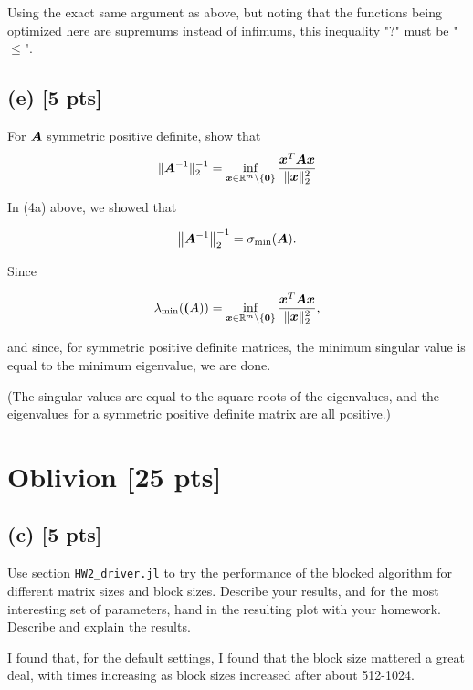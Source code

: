 \documentclass[twoside,10pt]{article}
\begin{document}
Using the exact same argument as above, but noting that the functions being optimized here are supremums instead of infimums, this inequality "$?$" must be "$\leq$".

\subsection*{(e) [5 pts]}
For $\bm{A}$ symmetric positive definite, show that 
\begin{equation*}
  \|\bm{A}^{-1}\|_{2}^{-1} = \inf \limits_{\bm{x} \in \mathbb{R}^m \setminus \{\bm{0}\}} \frac{\bm{x}^T \bm{A} \bm{x}}{\|\bm{x}\|^2_2}
\end{equation*}

In (4a) above, we showed that 

\begin{equation*}
  \left\|\mtx{A}^{-1}\right\|_2^{-1} = \sigma_{\mathrm{min}}\left(\mtx{A}\right).
\end{equation*}

Since 

\begin{equation*}
  \lambda_{\mathrm{min}}\left(\mtx(A)\right) = \inf \limits_{\vct{x} \in \R^m \setminus \{\vct{0}\}} \frac{\vct{x}^T \mtx{A}\vct{x}}{\|\vct{x}\|_2^2},
\end{equation*}

and since, for symmetric positive definite matrices, the minimum singular value is equal to the minimum eigenvalue, we are done.

(The singular values are equal to the square roots of the eigenvalues, and the eigenvalues for a symmetric positive definite matrix are all positive.)

\section{Oblivion [25 pts]}
\subsection*{(c) [5 pts]}
Use section \texttt{HW2\_driver.jl} to try the performance of the blocked algorithm for different matrix sizes and block sizes. 
Describe your results, and for the most interesting set of parameters, hand in the resulting plot with your homework.
Describe and explain the results.

\quad I found that, for the default settings, I found that the block size mattered a great deal, with times increasing as block sizes increased after about 512-1024.
\end{document}
